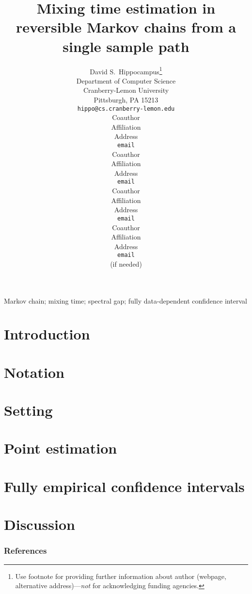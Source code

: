\documentclass{article}
\title{%
  Mixing time estimation in reversible Markov chains from a single
  sample path%
}
\author{
David S.~Hippocampus\thanks{ Use footnote for providing further information
about author (webpage, alternative address)---\emph{not} for acknowledging
funding agencies.} \\
Department of Computer Science\\
Cranberry-Lemon University\\
Pittsburgh, PA 15213 \\
\texttt{hippo@cs.cranberry-lemon.edu} \\
\And
Coauthor \\
Affiliation \\
Address \\
\texttt{email} \\
\AND
Coauthor \\
Affiliation \\
Address \\
\texttt{email} \\
\And
Coauthor \\
Affiliation \\
Address \\
\texttt{email} \\
\And
Coauthor \\
Affiliation \\
Address \\
\texttt{email} \\
(if needed)\\
}
\begin{document}
\begin{bibunit}[myunsrt]
  \maketitle

  \begin{abstract} 
  
  \end{abstract} 

  \begin{keywords}
    Markov chain; mixing time; spectral gap;
    fully data-dependent confidence interval
  \end{keywords}
  \fi

  \section{Introduction}\label{sec:intro}
  

  \section{Notation}\label{sec:notation}
  

  \section{Setting}\label{sec:setting}
  

  \section{Point estimation}\label{sec:rates}
  

  \section{Fully empirical confidence intervals}\label{sec:empirical}
  

  \section{Discussion}\label{sec:discussion}
  

  \subsubsection*{References}
  {\def\section*#1{}\small\putbib[all]}
\end{bibunit}
\end{document}
